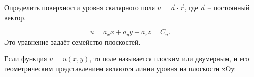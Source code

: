     \begin{example}
        Определить поверхности уровня скалярного поля \( u = \vec{a}\cdot\vec{r} \), где \( \vec{a} \) -- постоянный вектор.
    \end{example}

    \begin{solution}
    
    \[ u = a_xx + a_yy + a_zz = C_n. \]
    Это уравнение задаёт семейство плоскостей.
    \end{solution}

    \begin{remark}
        Если функция \( u = u(x,y) \), то поле называется плоским или двумерным, и его геометрическим представлением являются линии уровня на плоскости xOy.
    \end{remark}

    \begin{figure}[h]
        \center
        \begin{minipage}[h]{0.49\textwidth}
        \end{minipage}
        \hfill
        \begin{minipage}[h]{0.49\textwidth}
        \end{minipage}
    \end{figure}

